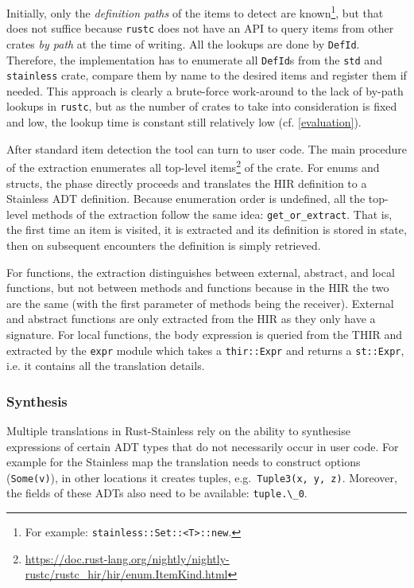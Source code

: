 Initially, only the \emph{definition paths} of the items to detect are
known\footnote{For example: \lstinline!stainless::Set::<T>::new!.}, but that
does not suffice because \lstinline!rustc! does not have an API to query items
from other crates \emph{by path} at the time of writing. All the lookups are
done by \lstinline!DefId!. Therefore, the implementation has to enumerate all
\lstinline!DefId!s from the \lstinline!std! and \lstinline!stainless! crate,
compare them by name to the desired items and register them if needed. This
approach is clearly a brute-force work-around to the lack of by-path lookups in
\lstinline!rustc!, but as the number of crates to take into consideration is
fixed and low, the lookup time is constant still relatively low (cf.
\autoref{evaluation}).

After standard item detection the tool can turn to user code. The main procedure
of the extraction enumerates all top-level
items\footnote{\url{https://doc.rust-lang.org/nightly/nightly-rustc/rustc_hir/hir/enum.ItemKind.html}}
of the crate. For enums and structs, the phase directly proceeds and translates
the HIR definition to a Stainless ADT definition. Because enumeration order is
undefined, all the top-level methods of the extraction follow the same idea:
\lstinline!get_or_extract!. That is, the first time an item is visited, it is
extracted and its definition is stored in state, then on subsequent encounters
the definition is simply retrieved.

For functions, the extraction distinguishes between external, abstract, and
local functions, but not between methods and functions because in the HIR the
two are the same (with the first parameter of methods being the receiver).
External and abstract functions are only extracted from the HIR as they only
have a signature. For local functions, the body expression is queried from the
THIR and extracted by the \lstinline!expr! module which takes a
\lstinline!thir::Expr! and returns a \lstinline!st::Expr!, i.e. it contains all
the translation details.

\subsubsection{Synthesis}

Multiple translations in Rust-Stainless rely on the ability to synthesise
expressions of certain ADT types that do not necessarily occur in user code. For
example for the Stainless map the translation needs to construct options
(\passthrough{\lstinline!Some(v)!}), in other locations it creates tuples,
e.g.~\passthrough{\lstinline!Tuple3(x, y, z)!}. Moreover, the fields of these
ADTs also need to be available: \lstinline!tuple.\_0!.

